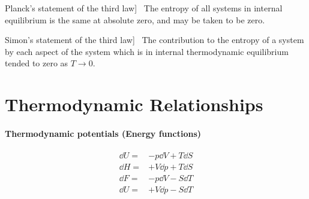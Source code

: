 \documentclass[UTF8]{book}
\newenvironment{theorem}[2][Theorem]{\begin{trivlist}
\item[\hskip \labelsep {\bfseries #1}\hskip \labelsep {\bfseries }]}{\end{trivlist}}
\begin{document}
\begin{theorem}
[Planck's statement of the third law]~  {The entropy of all systems in internal equilibrium is the same at absolute zero, and may be taken to be zero.}
\end{theorem}

\begin{theorem}
[Simon's statement of the third law]~  {The contribution to the entropy of a system by each aspect of the system which is in internal thermodynamic equilibrium tended to zero as $T \rightarrow 0$.}
\end{theorem}


\section{Thermodynamic Relationships}
\paragraph{Thermodynamic potentials (Energy functions)}
\begin{align*}
\dd U = & -p \dd{V}+T \dd{S}\\
\dd H = & +V \dd{p}+T \dd{S}\\
\dd F = & -p \dd{V}-S \dd{T}\\
\dd U = & +V \dd{p}-S \dd{T}
\end{align*}
\end{document}
